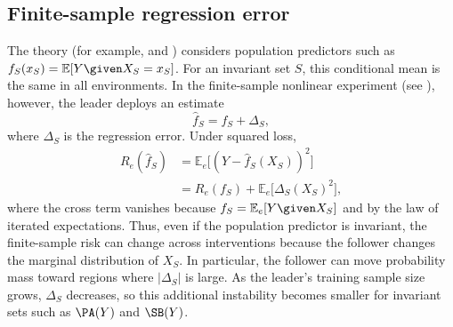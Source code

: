 \subsection{Finite-sample regression error}
\label{app:synthetic_regression_error}
The theory (for example,  and ) 
considers
population predictors such as
$f_S(x_S)=\mathbb E[Y\given X_S=x_S]$. For an invariant set $S$, this conditional
mean is the same in all environments. In the finite-sample nonlinear experiment (see ),
however, the leader deploys an estimate
\[
    \hat f_S = f_S + \Delta_S,
\]
where $\Delta_S$ is the regression error. Under squared loss,
\begin{align*}
    R_e(\hat f_S)
    &= \mathbb E_e\big[(Y-\hat f_S(X_S))^2\big]\\
    &= R_e(f_S)
       + \mathbb E_e\big[\Delta_S(X_S)^2\big],
\end{align*}
where the cross term vanishes because $f_S=\mathbb E_e[Y\given X_S]$ and by the law of iterated expectations.
Thus, even if the population predictor is invariant, the finite-sample risk can
change across interventions because the follower changes the marginal
distribution of $X_S$. In particular, the follower can move probability mass
toward regions where $|\Delta_S|$ is large. As the leader's training sample size grows,
$\Delta_S$ decreases, so this additional instability becomes smaller for invariant
sets such as $\PA(Y)$ and $\SB(Y)$.
